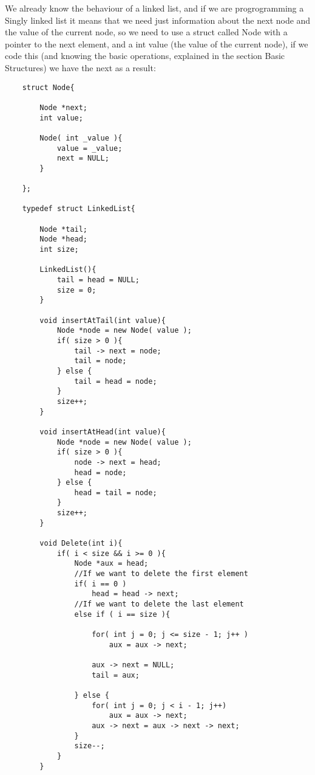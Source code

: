 We already know the behaviour of a linked list, and if we are progrogramming a Singly linked list it means that we need just information about the next node and the value of the current node, so we need to use a struct called Node with a pointer to the next element, and a int value (the value of the current node), if we code this (and knowing the basic operations, explained in the section Basic Structures) we have the next as a result:
\begin{lstlisting}
    struct Node{

        Node *next;
        int value;

        Node( int _value ){
            value = _value;
            next = NULL;
        }

    };

    typedef struct LinkedList{
        
        Node *tail;
        Node *head;
        int size;

        LinkedList(){
            tail = head = NULL;
            size = 0;
        }

        void insertAtTail(int value){
            Node *node = new Node( value );
            if( size > 0 ){
                tail -> next = node;
                tail = node;
            } else {
                tail = head = node;
            }
            size++;
        }

        void insertAtHead(int value){
            Node *node = new Node( value );
            if( size > 0 ){ 
                node -> next = head;
                head = node;
            } else {
                head = tail = node;
            }
            size++;
        }

        void Delete(int i){
            if( i < size && i >= 0 ){
                Node *aux = head;
                //If we want to delete the first element
                if( i == 0 )
                    head = head -> next;
                //If we want to delete the last element
                else if ( i == size ){

                    for( int j = 0; j <= size - 1; j++ )
                        aux = aux -> next;

                    aux -> next = NULL;
                    tail = aux;
        
                } else {
                    for( int j = 0; j < i - 1; j++)
                        aux = aux -> next;
                    aux -> next = aux -> next -> next;
                } 
                size--;
            }
        }


\end{lstlisting}
